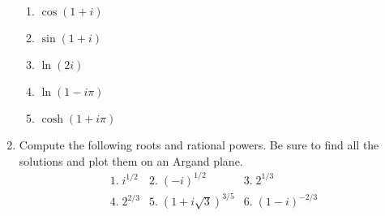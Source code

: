 \documentclass{article}
\begin{document}
\begin{enumerate}
\begin{enumerate}
\item $\cos \left( 1+i\right)$

\item $\sin \left( 1+i\right)$

\item $\ln (2i)$

\item $\ln \left( 1-i\pi \right)$

\item $\cosh \left( 1+i\pi \right)$
\end{enumerate}

\item Compute the following roots and rational powers. Be sure to find all the solutions and plot them on an Argand plane. 
\[
\begin{array}{lll}
1.\;i^{1/2} & 2.\;\left( -i\right) ^{1/2} & 3.\;2^{1/3} \\ 
4.\;2^{2/3} & 5.\;(1+i\sqrt{3})^{3/5} & 6.\;\left( 1-i\right) ^{-2/3}
\end{array}
\]
\end{enumerate}
\end{document}
